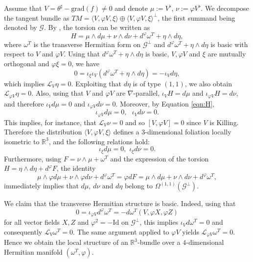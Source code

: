 \documentclass{article}
\makeatletter
\renewenvironment{proof}[1][\proofname]{%
  \par\pushQED{\qed}%
  \normalfont\topsep6\p@\@plus6\p@\relax
  \trivlist
  \item[\hskip\labelsep
        \textbf{\textup{#1}}\@addpunct{.}]\ignorespaces
}{%
  \popQED\endtrivlist\@endpefalse
}
\theoremstyle{definition}
\renewcommand{\phi}{\varphi}
\numberwithin{equation}{section}
\makeatother
\begin{document}
\begin{proof}
Assume that $V=\theta^\sharp-\mathrm{grad}(f) \neq 0$ and denote $\mu := V^{\flat}$, $\nu := \phi V^{\flat}$. We decompose the tangent bundle as $TM = \langle V, \phi V, \xi \rangle \oplus \langle V, \phi V, \xi \rangle^{\perp}$, the first summand being denoted by $\mathcal{G}$. By \cite[Theorem 5.6]{KS}, the torsion can be written as
\begin{equation} \label{eqn:H}
  H = \mu \wedge d\mu + \nu \wedge d\nu + d^{\phi}\omega^{T} + \eta \wedge d\eta,  
\end{equation}
where $\omega^{T}$ is the transverse Hermitian form on $\mathcal{G}^\perp$ and $d^{\phi}\omega^{T} + \eta \wedge d\eta$ is basic with respect to $V$ and $\phi V$. Using that $d^{\phi}\omega^{T} + \eta \wedge d\eta$ is basic, $V, \phi V$ and $\xi$ are mutually orthogonal \cite[Theorem 5.6]{KS} and $\phi\xi = 0$, we have
\[
0 = \iota_{\xi}\iota_{V}(d^{\phi}\omega^{T} + \eta \wedge d\eta) = -\iota_{V} d\eta,
\]
which implies $\mathcal{L}_{V}\eta = 0$. Exploiting that $d\eta$ is of type $(1,1)$, we also obtain $\mathcal{L}_{\phi V}\eta = 0$. Also, using that $V$ and $\phi V$ are $\nabla$-parallel, $\iota_V H=d\mu$ and $\iota_{\phi V} H=d\nu$, and therefore $\iota_{V} d\mu = 0$ and $\iota_{\phi V} d\nu = 0$. Moreover, by Equation \eqref{eqn:H}, 
\[\iota_{\phi V} d\mu = 0,\  \ \  \iota_{V} d\nu = 0.\]
This implies, for instance, that $\mathcal{L}_V \nu=0$ and so $[V,\phi V]=0$ since $V$ is Killing. 
Therefore the distribution $\langle V, \phi V, \xi \rangle$ defines a $3$-dimensional foliation locally isometric to $\mathbb{R}^{3}$, and the following relations hold:
\[
\iota_{\xi} d\mu = 0,\,\, \iota_{\xi} d\nu = 0.
\]
Furthermore, using $F = \nu \wedge \mu + \omega^{T}$ and the expression of the torsion $H=\eta \wedge d\eta+ d^\phi F$, the identity
\[
 \mu \wedge \phi d\mu + \nu \wedge \phi d\nu + d^{\phi}\omega^{T}= \phi dF = \mu \wedge d\mu + \nu \wedge d\nu + d^{\phi}\omega^{T},
\]
immediately implies that $d\mu$, $d\nu$ and $d\eta$ belong to $\Omega^{(1,1)}(\mathcal{G}^{\perp})$.\par
We claim that the transverse Hermitian structure is basic. Indeed, using that
\[
0 = \iota_{\phi V} d^{\phi}\omega^{T} = -d\omega^{T}(V, \phi X, \phi Z)
\]
for all vector fields $X,Z$ and $\phi^{2} = -\mathrm{Id}$ on $\mathcal{G}^\perp$, this implies $\iota_{V} d\omega^{T} = 0$ and consequently $\mathcal{L}_{V}\omega^{T} = 0$. The same argument applied to $\phi V$ yields $\mathcal{L}_{\phi V}\omega^{T} = 0$. Hence we obtain the local structure of an $\mathbb{R}^{3}$-bundle over a $4$-dimensional Hermitian manifold $(\omega^{T}, \phi)$.\par

\end{proof}
\end{document}
